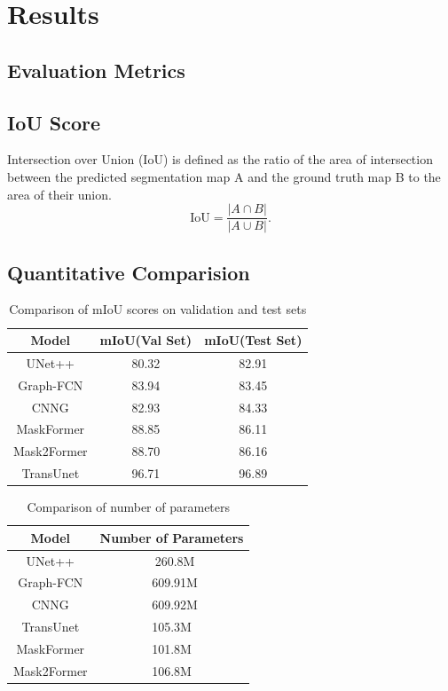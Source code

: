 \section{Results}
\label{sec:results}

\subsection{Evaluation Metrics}
\subsection{IoU Score}
Intersection over Union (IoU) is defined as the ratio of the area of intersection between the predicted segmentation map A and the ground truth map B to the area of their union.
\begin{equation*} 
\text{IoU}=  \frac{|A \cap B|}{|A \cup B|}. 
\end{equation*} 

\subsection{Quantitative Comparision}
\begin{table}[h]
    \centering
    \begin{tabular}{|c|c|c|}
        \hline
        Model & mIoU(Val Set) & mIoU(Test Set) \\
        \hline
        UNet++ & 80.32 & 82.91 \\
        Graph-FCN & 83.94 & 83.45 \\
        CNNG & 82.93 & 84.33 \\
        MaskFormer & 88.85 & 86.11 \\
        Mask2Former & 88.70 & 86.16 \\
        TransUnet & 96.71 & 96.89 \\
        \hline
    \end{tabular}
    \caption{Comparison of mIoU scores on validation and test sets}
    \label{tab:results}
\end{table}

\begin{table}[h]
    \centering
    \begin{tabular}{|c|c|}
        \hline
        Model & Number of Parameters \\
        \hline
        UNet++ & \ 260.8M \\
        Graph-FCN & \ 609.91M \\
        CNNG & \ 609.92M \\
        TransUnet &  105.3M \\
        MaskFormer &  101.8M \\
        Mask2Former &  106.8M \\
        \hline
    \end{tabular}
    \caption{Comparison of number of parameters}
    \label{tab:results}
\end{table}

